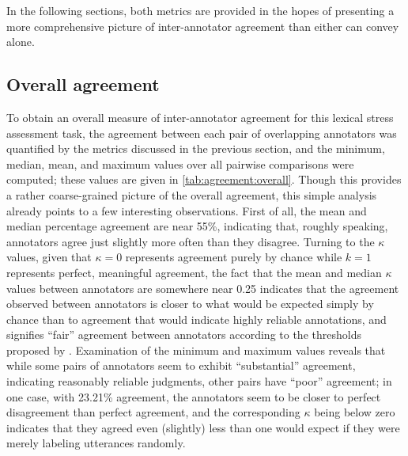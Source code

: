 		In the following sections, both metrics are provided in the hopes of presenting a more comprehensive picture of inter-annotator agreement than either can convey alone.  
		
		
		\subsection{Overall agreement}
		\label{sec:agreement:overall}
		
		To obtain an overall measure of inter-annotator agreement for this lexical stress assessment task, the agreement between each pair of overlapping annotators was quantified by the metrics discussed in the previous section, and the minimum, median, mean, and maximum values over all pairwise comparisons were computed; these values are given in \cref{tab:agreement:overall}.
	Though this provides a rather coarse-grained picture of the overall agreement, this simple analysis already points to a few interesting observations. First of all, the mean and median percentage agreement are near 55\%, indicating that, roughly speaking, annotators agree just slightly more often than they disagree.
	Turning to the $\kappa$ values, given that $\kappa = 0$ represents agreement purely by chance while $k = 1$ represents perfect, meaningful agreement, the fact that the mean and median $\kappa$ values between annotators are somewhere near 0.25 indicates that the agreement observed between annotators is closer to what would be expected simply by chance than to agreement that would indicate highly reliable annotations, and signifies ``fair'' agreement between annotators according to the thresholds proposed by \textcite{Landis1977}. Examination of the minimum and maximum values reveals that while some pairs of annotators seem to exhibit ``substantial'' agreement, 
	indicating reasonably reliable judgments, other pairs have ``poor'' agreement; in one case, with 23.21\% agreement, the annotators seem to be closer to perfect disagreement than perfect agreement, and the corresponding $\kappa$ being below zero indicates that they agreed even (slightly) less than one would expect if they were merely labeling utterances randomly. 
	

